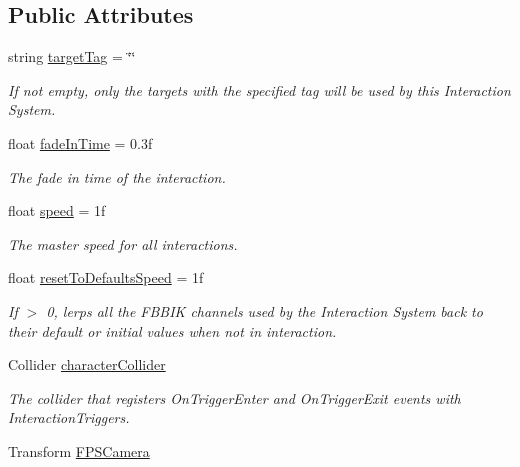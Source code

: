 \subsection*{Public Attributes}
\begin{DoxyCompactItemize}
\item 
string \mbox{\hyperlink{class_root_motion_1_1_final_i_k_1_1_interaction_system_ad4877732927593d9a26bc65f96bc817f}{target\+Tag}} = \char`\"{}\char`\"{}
\begin{DoxyCompactList}\small\item\em If not empty, only the targets with the specified tag will be used by this Interaction System. \end{DoxyCompactList}\item 
float \mbox{\hyperlink{class_root_motion_1_1_final_i_k_1_1_interaction_system_adb17577d7290a11cad5e2ef1ba78565d}{fade\+In\+Time}} = 0.\+3f
\begin{DoxyCompactList}\small\item\em The fade in time of the interaction. \end{DoxyCompactList}\item 
float \mbox{\hyperlink{class_root_motion_1_1_final_i_k_1_1_interaction_system_a7858c5f88281cb0bf8c9b4f280435f81}{speed}} = 1f
\begin{DoxyCompactList}\small\item\em The master speed for all interactions. \end{DoxyCompactList}\item 
float \mbox{\hyperlink{class_root_motion_1_1_final_i_k_1_1_interaction_system_a80948b3ffe2193419fa8afb474d20d5a}{reset\+To\+Defaults\+Speed}} = 1f
\begin{DoxyCompactList}\small\item\em If $>$ 0, lerps all the F\+B\+B\+IK channels used by the Interaction System back to their default or initial values when not in interaction. \end{DoxyCompactList}\item 
Collider \mbox{\hyperlink{class_root_motion_1_1_final_i_k_1_1_interaction_system_ab5b6cdaae10a8196fa6ed2d7e7859220}{character\+Collider}}
\begin{DoxyCompactList}\small\item\em The collider that registers On\+Trigger\+Enter and On\+Trigger\+Exit events with Interaction\+Triggers. \end{DoxyCompactList}\item 
Transform \mbox{\hyperlink{class_root_motion_1_1_final_i_k_1_1_interaction_system_abf5377b3491c35998b2dc004499ab851}{F\+P\+S\+Camera}}

\end{DoxyCompactItemize}
